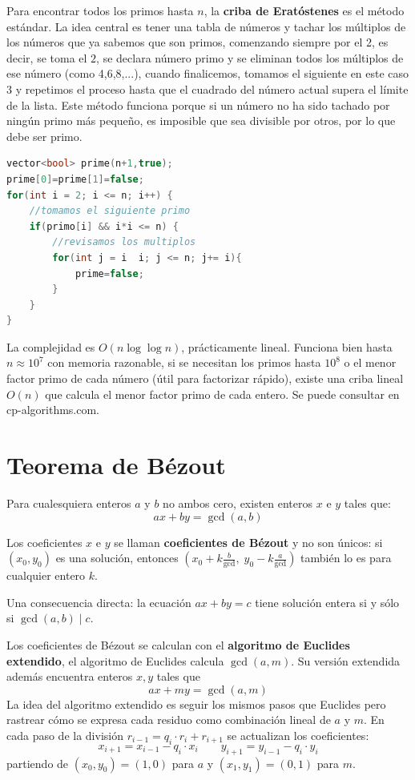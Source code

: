 Para encontrar todos los primos hasta $n$, la \textbf{criba de Eratóstenes} es el método estándar. La idea central es tener una tabla de números y tachar los múltiplos de los números que ya sabemos que son primos, comenzando siempre por el 2, es decir, se toma el $2$, se declara número primo y se eliminan todos los múltiplos de ese número (como 4,6,8,...), cuando finalicemos, tomamos el siguiente en este caso $3$ y repetimos el proceso hasta que el cuadrado del número actual supera el límite de la lista. Este método funciona porque si un número no ha sido tachado por ningún primo más pequeño, es imposible que sea divisible por otros, por lo que debe ser primo.

\begin{lstlisting}[language=C++]
vector<bool> prime(n+1,true);
prime[0]=prime[1]=false;
for(int i = 2; i <= n; i++) {
    //tomamos el siguiente primo
    if(primo[i] && i*i <= n) {
        //revisamos los multiplos
        for(int j = i  i; j <= n; j+= i){
            prime=false;
        }
    }
}
\end{lstlisting}
 
La complejidad es $O(n \log \log n)$, prácticamente lineal. Funciona bien hasta $n \approx 10^7$ con memoria razonable, si se necesitan los primos hasta $10^8$ o el menor factor primo de cada número (útil para factorizar rápido), existe una criba lineal $O(n)$ que calcula el menor factor primo de cada entero. Se puede consultar en cp-algorithms.com.

\section{Teorema de Bézout}

Para cualesquiera enteros $a$ y $b$ no ambos cero, existen enteros $x$ e $y$ tales que:
\[
ax + by = \gcd(a, b)
\]
 
Los coeficientes $x$ e $y$ se llaman \textbf{coeficientes de Bézout} y no son únicos: si $(x_0, y_0)$ es una solución, entonces $(x_0 + k\frac{b}{\gcd}, \; y_0 - k\frac{a}{\gcd})$ también lo es para cualquier entero $k$.
 
Una consecuencia directa: la ecuación $ax + by = c$ tiene solución entera si y sólo si $\gcd(a,b) \mid c$.
 
Los coeficientes de Bézout se calculan con el \textbf{algoritmo de Euclides extendido}, el algoritmo de Euclides calcula $\gcd(a,m)$. Su versión extendida además encuentra enteros $x, y$ tales que
\[
ax + my = \gcd(a,m)
\] 
La idea del algoritmo extendido es seguir los mismos pasos que Euclides pero rastrear cómo se expresa cada residuo como combinación lineal de $a$ y $m$. En cada paso de la división $r_{i-1} = q_i \cdot r_i + r_{i+1}$ se actualizan los coeficientes:
\[
x_{i+1} = x_{i-1} - q_i \cdot x_i \qquad y_{i+1} = y_{i-1} - q_i \cdot y_i
\]
partiendo de $(x_0, y_0) = (1, 0)$ para $a$ y $(x_1, y_1) = (0, 1)$ para $m$.
 

